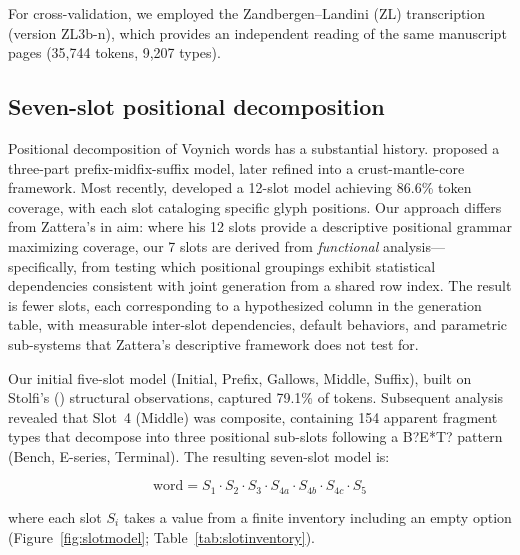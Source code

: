 \documentclass[12pt]{article}
\begin{document}
For cross-validation, we employed the Zandbergen--Landini (ZL) transcription (version ZL3b-n), which provides an independent reading of the same manuscript pages (35,744 tokens, 9,207 types).

\subsection{Seven-slot positional decomposition}
\label{sec:slotmodel}

Positional decomposition of Voynich words has a substantial history. \citet{Stolfi1997} proposed a three-part prefix-midfix-suffix model, later refined into a crust-mantle-core framework. Most recently, \citet{Zattera2022} developed a 12-slot model achieving 86.6\% token coverage, with each slot cataloging specific glyph positions. Our approach differs from Zattera's in aim: where his 12 slots provide a descriptive positional grammar maximizing coverage, our 7 slots are derived from \emph{functional} analysis---specifically, from testing which positional groupings exhibit statistical dependencies consistent with joint generation from a shared row index. The result is fewer slots, each corresponding to a hypothesized column in the generation table, with measurable inter-slot dependencies, default behaviors, and parametric sub-systems that Zattera's descriptive framework does not test for.

Our initial five-slot model (Initial, Prefix, Gallows, Middle, Suffix), built on Stolfi's (\citeyear{Stolfi1997}) structural observations, captured 79.1\% of tokens. Subsequent analysis revealed that Slot~4 (Middle) was composite, containing 154 apparent fragment types that decompose into three positional sub-slots following a B?E*T? pattern (Bench, E-series, Terminal). The resulting seven-slot model is:

\begin{equation}
  \text{word} = S_1 \cdot S_2 \cdot S_3 \cdot S_{4a} \cdot S_{4b} \cdot S_{4c} \cdot S_5
  \label{eq:slotmodel}
\end{equation}

\noindent where each slot $S_i$ takes a value from a finite inventory including an empty option (Figure~\ref{fig:slotmodel}; Table~\ref{tab:slotinventory}).
\end{document}
